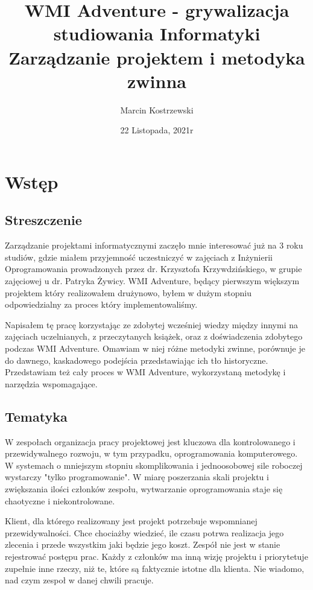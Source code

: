 \documentclass{article}
\title{
    WMI Adventure - grywalizacja studiowania Informatyki \\
    \large Zarządzanie projektem i metodyka zwinna
    }
\author{Marcin Kostrzewski}
\date{22 Listopada, 2021r}
\begin{document}
\maketitle
\newpage
\tableofcontents
\newpage


\section{Wstęp}

\subsection{Streszczenie}
Zarządzanie projektami informatycznymi zaczęło mnie interesować już na 3 roku studiów, gdzie miałem przyjemność uczestniczyć w zajęciach z Inżynierii Oprogramowania prowadzonych przez
dr. Krzysztofa Krzywdzińskiego, w grupie zajęciowej u dr. Patryka Żywicy. WMI Adventure, będący pierwszym większym projektem który realizowałem drużynowo, byłem w dużym stopniu odpowiedzialny za
proces który implementowaliśmy.

Napisałem tę pracę korzystając ze zdobytej wcześniej wiedzy między innymi na zajęciach uczelnianych, z przeczytanych książek,
oraz z doświadczenia zdobytego podczas WMI Adventure. Omawiam w niej różne metodyki zwinne, porównuje je do dawnego, kaskadowego podejścia przedstawiając ich tło historyczne. Przedstawiam też cały proces w WMI Adventure, wykorzystaną metodykę i narzędzia wspomagające.

\subsection{Tematyka}
W zespołach organizacja pracy projektowej jest kluczowa dla kontrolowanego i przewidywalnego rozwoju, w tym przypadku, oprogramowania komputerowego. W systemach o mniejszym stopniu skomplikowania
i jednoosobowej sile roboczej wystarczy "tylko programowanie". W miarę poszerzania skali projektu i zwiększania ilości członków zespołu, wytwarzanie oprogramowania staje się chaotyczne i niekontrolowane.

Klient, dla którego realizowany jest projekt potrzebuje wspomnianej przewidywalności. Chce chociażby wiedzieć, ile czasu potrwa realizacja jego zlecenia i przede wszystkim jaki będzie jego koszt. Zespół nie jest w stanie
rejestrować postępu prac. Każdy z członków ma inną wizję projektu i priorytetuje zupełnie inne rzeczy, niż te, które są faktycznie istotne dla klienta. Nie wiadomo, nad czym zespoł w danej chwili pracuje.
\end{document}
